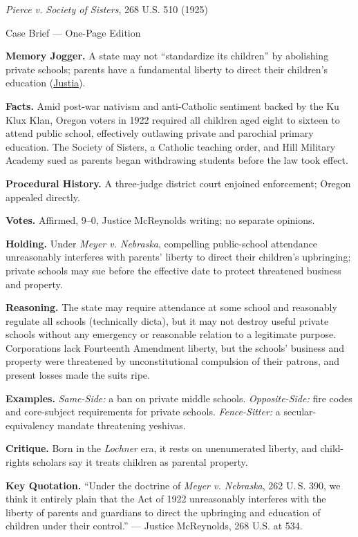 \documentclass[12pt]{article}
\begin{document}
\begin{center}
{\Large \textit{Pierce v. Society of Sisters}, 268 U.S. 510 (1925)\par}
\vspace{0.3em}
{\normalsize Case Brief --- One-Page Edition\par}
\end{center}

\textbf{Memory Jogger.} A state may not ``standardize its children'' by abolishing private schools; parents have a fundamental liberty to direct their children's education (\href{https://supreme.justia.com/cases/federal/us/268/510/}{Justia}).

\textbf{Facts.} Amid post-war nativism and anti-Catholic sentiment backed by the Ku Klux Klan, Oregon voters in 1922 required all children aged eight to sixteen to attend public school, effectively outlawing private and parochial primary education. The Society of Sisters, a Catholic teaching order, and Hill Military Academy sued as parents began withdrawing students before the law took effect.

\textbf{Procedural History.} A three-judge district court enjoined enforcement; Oregon appealed directly.

\textbf{Votes.} Affirmed, 9--0, Justice McReynolds writing; no separate opinions.

\textbf{Holding.} Under \textit{Meyer v. Nebraska}, compelling public-school attendance unreasonably interferes with parents' liberty to direct their children's upbringing; private schools may sue before the effective date to protect threatened business and property.

\textbf{Reasoning.} The state may require attendance at some school and reasonably regulate all schools (technically dicta), but it may not destroy useful private schools without any emergency or reasonable relation to a legitimate purpose. Corporations lack Fourteenth Amendment liberty, but the schools' business and property were threatened by unconstitutional compulsion of their patrons, and present losses made the suits ripe.

\textbf{Examples.} \emph{Same-Side:} a ban on private middle schools. \emph{Opposite-Side:} fire codes and core-subject requirements for private schools. \emph{Fence-Sitter:} a secular-equivalency mandate threatening yeshivas.

\textbf{Critique.} Born in the \textit{Lochner} era, it rests on unenumerated liberty, and child-rights scholars say it treats children as parental property.

\textbf{Key Quotation.} ``Under the doctrine of \textit{Meyer v. Nebraska}, 262 U.\,S. 390, we think it entirely plain that the Act of 1922 unreasonably interferes with the liberty of parents and guardians to direct the upbringing and education of children under their control.'' --- Justice McReynolds, 268 U.S. at 534.
\end{document}
